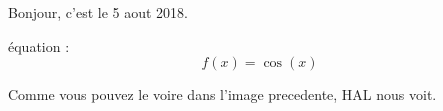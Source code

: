 ﻿Bonjour, c'est le 5 aout 2018.


équation :
\begin{equation}
  f(x) = \cos(x)
\end{equation}



Comme vous pouvez le voire dans l'image precedente, HAL nous voit.